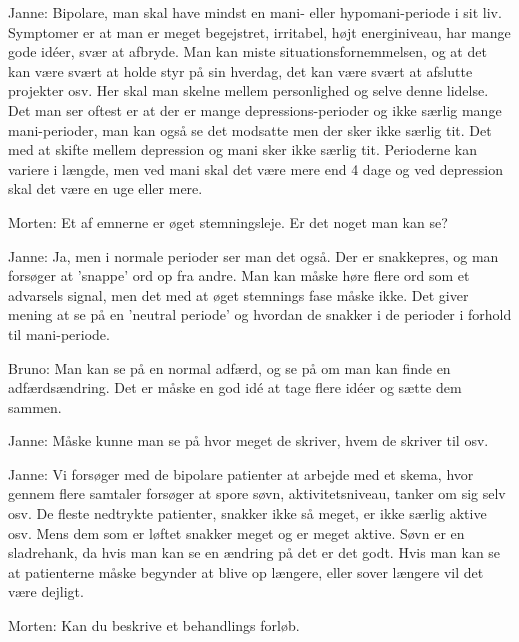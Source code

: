 Janne: Bipolare, man skal have mindst en mani- eller hypomani-periode i sit liv. Symptomer er at man er meget begejstret, irritabel, højt energiniveau, har mange gode idéer, svær at afbryde. Man kan miste situationsfornemmelsen, og at det kan være svært at holde styr på sin hverdag, det kan være svært at afslutte projekter osv. Her skal man skelne mellem personlighed og selve denne lidelse. Det man ser oftest er at der er mange depressions-perioder og ikke særlig mange mani-perioder, man kan også se det modsatte men der sker ikke særlig tit. Det med at skifte mellem depression og mani sker ikke særlig tit. Perioderne kan variere i længde, men ved mani skal det være mere end 4 dage og ved depression skal det være en uge eller mere. 

Morten: Et af emnerne er øget stemningsleje. Er det noget man kan se?

Janne: Ja, men i normale perioder ser man det også. Der er snakkepres, og man forsøger at 'snappe' ord op fra andre. Man kan måske høre flere ord som et advarsels signal, men det med at øget stemnings fase måske ikke. Det giver mening at se på en 'neutral periode' og hvordan de snakker i de perioder i forhold til mani-periode.

Bruno: Man kan se på en normal adfærd, og se på om man kan finde en adfærdsændring. Det er måske en god idé at tage flere idéer og sætte dem sammen.

Janne: Måske kunne man se på hvor meget de skriver, hvem de skriver til osv. 

Janne: Vi forsøger med de bipolare patienter at arbejde med et skema, hvor gennem flere samtaler forsøger at spore søvn, aktivitetsniveau, tanker om sig selv osv. De fleste nedtrykte patienter, snakker ikke så meget, er ikke særlig aktive osv. Mens dem som er løftet snakker meget og er meget aktive. Søvn er en sladrehank, da hvis man kan se en ændring på det er det godt. Hvis man kan se at patienterne måske begynder at blive op længere, eller sover længere vil det være dejligt.

Morten: Kan du beskrive et behandlings forløb.

